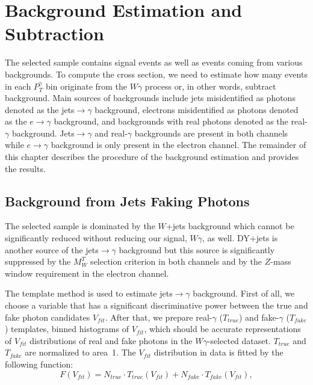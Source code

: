 \section{Background Estimation and Subtraction}
\label{sec:BackgroundSubtraction}

The selected sample contains signal events as well as events coming from various backgrounds. To compute the cross section, we need to estimate how many events in each $P_T^\gamma$ bin originate from the $W\gamma$ process or, in other words, subtract background. Main sources of backgrounds include jets misidentified as photons denoted as the jets$\rightarrow\gamma$ background, electrons misidentified as photons denoted as the $e\rightarrow\gamma$ background, and backgrounds with real photons denoted as the real-$\gamma$ background. Jets$\rightarrow\gamma$ and real-$\gamma$ backgrounds are present in both channels while $e\rightarrow\gamma$ background is only present in the electron channel. The remainder of this chapter describes the procedure of the background estimation and provides the results.

\subsection{Background from Jets Faking Photons}
\label{sec:BackgroundSubtraction_jtog}

The selected sample is dominated by the $W$+jets background which cannot be significantly reduced without reducing our signal, $W\gamma$, as well. DY+jets is another source of the jets$\rightarrow \gamma$ background but this source is significantly suppressed by the $M_W^T$ selection criterion in both channels and by the $Z$-mass window requirement in the electron channel.

The template method is used to estimate jets$ \rightarrow \gamma$ background. First of all, we choose a variable that has a significant discriminative power between the true and fake photon candidates $V_{fit}$. After that, we prepare real-$\gamma$ ($T_{true}$) and fake-$\gamma$ ($T_{fake}$) templates, binned histograms of $V_{fit}$, which should be accurate representations of $V_{fit}$ distributions of real and fake photons in the $W\gamma$-selected dataset. $T_{true}$ and $T_{fake}$ are normalized to area~1. The $V_{fit}$ distribution in data is fitted by the following function: 
\begin{equation}\label{eq:F_fit}
F(V_{fit})=N_{true} \cdot T_{true}(V_{fit}) + N_{fake} \cdot T_{fake}(V_{fit}),
\end{equation}

